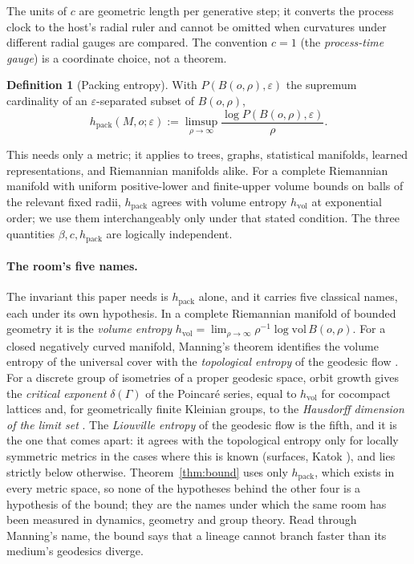 \documentclass[11pt,reqno]{amsart}
\theoremstyle{plain}
\theoremstyle{definition}
\newtheorem{definition}[theorem]{Definition}
\newcommand{\hpack}{h_{\mathrm{pack}}}
\newcommand{\hvol}{h_{\mathrm{vol}}}
\newcommand{\eps}{\varepsilon}
\begin{document}
The units of $c$ are geometric length per generative step; it converts the process clock to the host's radial ruler and cannot be omitted when curvatures under different radial gauges are compared. The convention $c=1$ (the \emph{process-time gauge}) is a coordinate choice, not a theorem.

\begin{definition}[Packing entropy]
With $P(B(o,\rho),\eps)$ the supremum cardinality of an $\eps$-separated subset of $B(o,\rho)$,
\[
\hpack(M,o;\eps):=\limsup_{\rho\to\infty}\frac{\log P(B(o,\rho),\eps)}{\rho}.
\]
\end{definition}

This needs only a metric; it applies to trees, graphs, statistical manifolds, learned representations, and Riemannian manifolds alike. For a complete Riemannian manifold with uniform positive-lower and finite-upper volume bounds on balls of the relevant fixed radii, $\hpack$ agrees with volume entropy $\hvol$ at exponential order; we use them interchangeably only under that stated condition. The three quantities $\beta,c,\hpack$ are logically independent.

\paragraph{The room's five names.}
The invariant this paper needs is $\hpack$ alone, and it carries five classical names, each under its own hypothesis. In a complete Riemannian manifold of bounded geometry it is the \emph{volume entropy} $\hvol=\lim_{\rho\to\infty}\rho^{-1}\log\mathrm{vol}\,B(o,\rho)$. For a closed negatively curved manifold, Manning's theorem identifies the volume entropy of the universal cover with the \emph{topological entropy} of the geodesic flow \cite{manning1979}. For a discrete group of isometries of a proper geodesic space, orbit growth gives the \emph{critical exponent} $\delta(\Gamma)$ of the Poincar\'e series, equal to $\hvol$ for cocompact lattices \cite{patterson1976,sullivan1979} and, for geometrically finite Kleinian groups, to the \emph{Hausdorff dimension of the limit set} \cite{bishopjones1997}. The \emph{Liouville entropy} of the geodesic flow is the fifth, and it is the one that comes apart: it agrees with the topological entropy only for locally symmetric metrics in the cases where this is known (surfaces, Katok \cite{katok1982}), and lies strictly below otherwise. Theorem~\ref{thm:bound} uses only $\hpack$, which exists in every metric space, so none of the hypotheses behind the other four is a hypothesis of the bound; they are the names under which the same room has been measured in dynamics, geometry and group theory. Read through Manning's name, the bound says that a lineage cannot branch faster than its medium's geodesics diverge.
\end{document}
